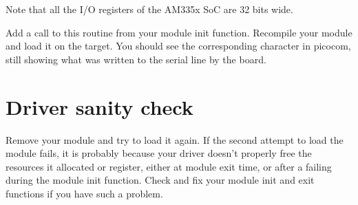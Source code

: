 Note that all the I/O registers of the AM335x SoC are 32 bits wide.

Add a call to this routine from your module init function. Recompile
your module and load it on the target. You should see the
corresponding character in picocom, still showing what was written to
the serial line by the board.

\section{Driver sanity check}

Remove your module and try to load it again. If the second attempt to
load the module fails, it is probably because your driver doesn't
properly free the resources it allocated or register, either at module
exit time, or after a failing during the module init function. Check
and fix your module init and exit functions if you have such a
problem.
